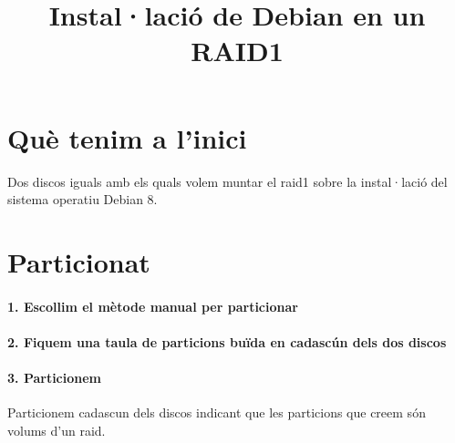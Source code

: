 \documentclass[a4paper]{article}
\begin{document}
\title{Instal·lació de Debian en un RAID1}
\maketitle

\section{Què tenim a l'inici}
Dos discos iguals amb els quals volem muntar el raid1 sobre la instal·lació del sistema operatiu Debian 8.
\section{Particionat}
\paragraph{1. Escollim el mètode manual per particionar\\}
\paragraph{2. Fiquem una taula de particions buïda en cadascún dels dos discos\\}
\paragraph{3. Particionem \\ }
Particionem cadascun dels discos indicant que les particions que creem són volums d'un raid.\\
\end{document}
